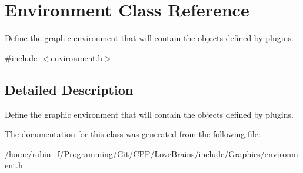 \section{Environment Class Reference}
\label{class_environment}


Define the graphic environment that will contain the objects defined by plugins.  




{\ttfamily \#include $<$environment.\+h$>$}



\subsection{Detailed Description}
Define the graphic environment that will contain the objects defined by plugins. 

The documentation for this class was generated from the following file\+:\begin{DoxyCompactItemize}
\item 
/home/robin\+\_\+f/\+Programming/\+Git/\+C\+P\+P/\+Love\+Brains/include/\+Graphics/environment.\+h\end{DoxyCompactItemize}
